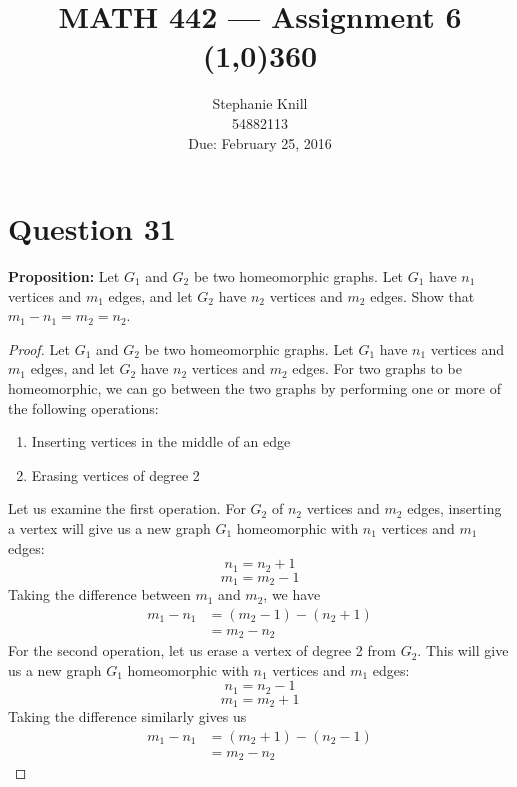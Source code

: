 \documentclass[11pt, oneside]{article}   	%
\begin{document}
\title{MATH 442 --- Assignment 6 \\
\line(1,0){360} \\              %
}
\author{
Stephanie Knill \\
54882113 \\
Due: February 25, 2016}

\date{}                   %
\maketitle




\section*{Question 31}

\textbf{Proposition:} Let $G_1$ and $G_2$ be two homeomorphic graphs. Let $G_1$ have $n_1$ vertices and $m_1$ edges, and let $G_2$ have $n_2$ vertices and $m_2$ edges. Show that $m_1 - n_1 = m_2 = n_2$.

\begin{proof}
Let $G_1$ and $G_2$ be two homeomorphic graphs. Let $G_1$ have $n_1$ vertices and $m_1$ edges, and let $G_2$ have $n_2$ vertices and $m_2$ edges. For two graphs to be homeomorphic, we can go between the two graphs by performing one or more of the following operations:
	\begin{enumerate}
		\item Inserting vertices in the middle of an edge
		\item Erasing vertices of degree 2
	\end{enumerate}
	Let us examine the first operation. For $G_2$ of $n_2$ vertices and $m_2$ edges, inserting a vertex will give us a new graph $G_1$ homeomorphic with $n_1$ vertices and $m_1$ edges:
	$$n_1 = n_2 + 1$$
	$$m_1 = m_2 - 1$$
	Taking the difference between $m_1$ and $m_2$, we have
	\begin{align*}
		m_1-n_1 & = (m_2-1)-(n_2+1) \\
		& = m_2-n_2
	\end{align*}
	For the second operation, let us erase a vertex of degree 2 from $G_2$. This will give us a new graph $G_1$ homeomorphic with $n_1$ vertices and $m_1$ edges:
	$$n_1 = n_2 - 1$$
	$$m_1 = m_2 + 1$$
	Taking the difference similarly gives us
	\begin{align*}
		m_1-n_1 & = (m_2+1)-(n_2-1) \\
		& = m_2-n_2
	\end{align*}	
\end{proof}
\end{document}
